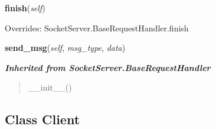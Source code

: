     \vspace{0.5ex}

\hspace{.8\funcindent}\begin{boxedminipage}{\funcwidth}

    \raggedright \textbf{finish}(\textit{self})

\setlength{\parskip}{2ex}
\setlength{\parskip}{1ex}
      Overrides: SocketServer.BaseRequestHandler.finish

    \end{boxedminipage}

    \label{network:ClientHandler:send_msg}

    \vspace{0.5ex}

\hspace{.8\funcindent}\begin{boxedminipage}{\funcwidth}

    \raggedright \textbf{send\_msg}(\textit{self}, \textit{msg\_type}, \textit{data})

\setlength{\parskip}{2ex}
\setlength{\parskip}{1ex}
    \end{boxedminipage}


\large{\textbf{\textit{Inherited from SocketServer.BaseRequestHandler}}}

\begin{quote}
\_\_init\_\_()
\end{quote}


\subsection{Class Client}

    \label{network:Client}


